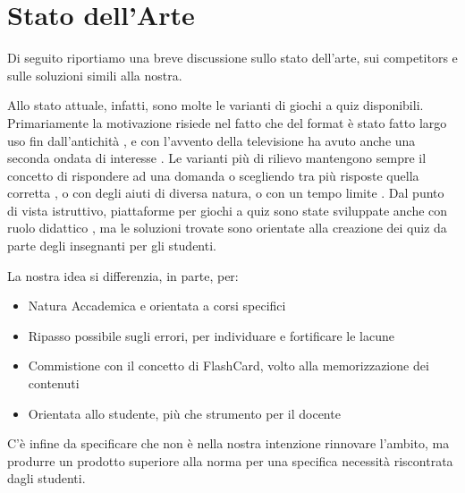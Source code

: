 

\chapter{Stato dell'Arte}
 Di seguito riportiamo una breve discussione sullo stato dell'arte, sui competitors e sulle soluzioni simili alla nostra.
 
 Allo stato attuale, infatti, sono molte le varianti di giochi a quiz disponibili. Primariamente la motivazione risiede nel fatto che del format è stato fatto largo uso fin dall'antichità \cite{quizgame}, e con l'avvento della televisione ha avuto anche una seconda ondata di interesse \cite{gameshow}. Le varianti più di rilievo mantengono sempre il concetto di rispondere ad una domanda o scegliendo tra più risposte quella corretta \cite{whowantstobeamillionaire}, o con degli aiuti di diversa natura, o con un tempo limite \cite{jeopardy}. 
 Dal punto di vista istruttivo, piattaforme per giochi a quiz sono state sviluppate anche con ruolo didattico \cite{quizlet}, ma le soluzioni trovate sono orientate alla creazione dei quiz da parte degli insegnanti per gli studenti.
 
 La nostra idea si differenzia, in parte, per: 
\begin{itemize}
    \item Natura Accademica e orientata a corsi specifici
    \item Ripasso possibile sugli errori, per individuare e fortificare le lacune
    \item Commistione con il concetto di FlashCard, volto alla memorizzazione dei contenuti
    \item Orientata allo studente, più che strumento per il docente 
\end{itemize}
 
 C'è infine da specificare che non è nella nostra intenzione rinnovare l'ambito, ma produrre un prodotto superiore alla norma per una specifica necessità riscontrata dagli studenti.
 